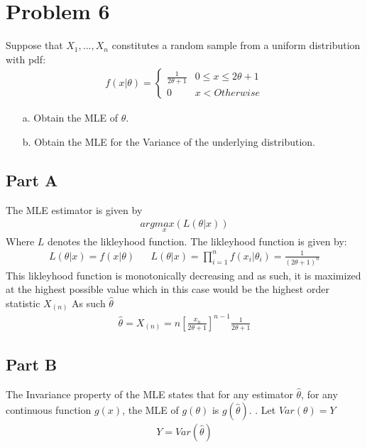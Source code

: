 \documentclass{article}
\begin{document}
\section*{Problem 6}
Suppose that $X_1,...,X_n$ constitutes a random sample from a uniform distribution with pdf:
\begin{align*}
f(x|\theta) = \begin{cases} 
      \frac{1}{2\theta + 1} & 0\leq x \leq 2\theta+1 \\
       0 & x < Otherwise
   \end{cases}
\end{align*}
\begin{enumerate}
\item[a.] Obtain the MLE of $\theta$.
\item[b.] Obtain the MLE for the Variance of the underlying distribution.
\end{enumerate}
\subsection*{Part A}
The MLE estimator is given by
\begin{align*}
arg \underset{x}{max} (L(\theta|x))
\end{align*}
Where $L$ denotes the likleyhood function. The likleyhood function is given by:
\begin{align*}
L(\theta|x) = f(x|\theta) && L(\theta|x) = \prod_{i=1}^{n} f(x_i|\theta_i) = \frac{1}{(2\theta + 1)^n}
\end{align*}
This likleyhood function is monotonically decreasing and as such, it is maximized at the highest possible value which in this case would be the highest order statistic $X_{(n)}$ As such $\hat{\theta}$
\begin{align*}
\boxed{ \hat{\theta} = X_{(n)} = n[\frac{x_n}{2\theta + 1}]^{n-1} \frac{1}{2\theta + 1} }
\end{align*}
\subsection*{Part B}
The Invariance property of the MLE states that for any estimator $\hat{\theta}$, for any continuous function $g(x)$, the MLE of $g(\theta)$ is $g(\hat{\theta})$. . Let $Var(\theta) = Y$
\begin{align*}
\boxed{ Y = Var(\hat{\theta})}
\end{align*}

\clearpage
\end{document}
